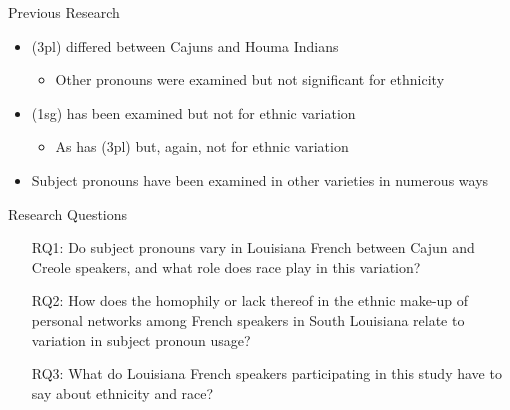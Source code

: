 \documentclass{beamer}\usepackage[]{graphicx}\usepackage[]{color}
\begin{document}
    \begin{frame}{Previous Research}
      \begin{itemize}
        \item (3pl) differed between Cajuns and Houma Indians \parencite{rottet_language_1995, dajko_ethnic_2009}
        \begin{itemize}
          \item Other pronouns were examined but not significant for ethnicity
        \end{itemize}
        \item (1sg) has been examined but not for ethnic variation \parencite{carmichael_language_2019, gudmestad_variationist_2022, klingler_probleme_2005}
        \begin{itemize}
          \item As has (3pl) but, again, not for ethnic variation \parencite{byers_defining_1988, klingler_if_2003, neumann_creole_1985}
        \end{itemize}
        \item Subject pronouns have been examined in other varieties in numerous ways \parencite{lambert_use_1967, schoch_probleme_1978}
      \end{itemize}
    \end{frame}

    \begin{frame}{Research Questions}
      \begin{itemize}
        \item[RQ1:] Do subject pronouns vary in Louisiana French between Cajun and Creole speakers, and what role does race play in this variation?
        \item[RQ2:] How does the homophily or lack thereof in the ethnic make-up of personal networks among French speakers in South Louisiana relate to variation in subject pronoun usage?
        \item[RQ3:] What do Louisiana French speakers participating in this study have to say about ethnicity and race?
      \end{itemize}
    \end{frame}
\end{document}
